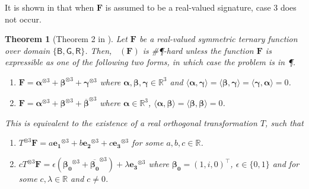 \documentclass[11pt]{article}
\newtheorem{theorem}{Theorem}[section]
\DeclareMathOperator{\holts}{Holant^*_3}
\newcommand{\db}{\mathsf{B}}
\newcommand{\dg}{\mathsf{G}}
\newcommand{\dr}{\mathsf{R}}
\newcommand{\teh}{^{\otimes 3}}
\newcommand{\transpose}{^\intercal}
\newcommand{\ternarytractgeneq}{$\mathfrak{A}$\xspace}
\newcommand{\ternarytractz}{$\mathfrak{B}$\xspace}
\begin{document}
It is shown in \cite{liu_restricted_nodate} that when $\mathbf{F}$ is assumed to be a real-valued signature, case 3 does not occur.
\begin{theorem}[Theorem 2 in \cite{liu_restricted_nodate}]
  \label{thm:dich-single-sym-ter-dom3-real}
  Let $\mathbf{F}$ be a real-valued symmetric ternary function over domain $\{\db, \dg, \dr\}$. 
  Then, $\holts(\mathbf{F})$ is \#\P-hard unless the function $\mathbf{F}$ is expressible as one of the following two forms, in which case the problem is in \P.
  \begin{enumerate}
\item[\ternarytractgeneq.] \label{ternary-tract-geneq}
      $\mathbf{F} = \boldsymbol{\alpha} \teh + \boldsymbol{\beta} \teh + \boldsymbol{\gamma}\teh$ 
      where $\boldsymbol{\alpha}, \boldsymbol{\beta}, \boldsymbol{\gamma} \in \mathbb{R}^3$ 
      and $\langle \boldsymbol{\alpha}, \boldsymbol{\gamma} \rangle = \langle \boldsymbol{\beta}, \boldsymbol{\gamma} \rangle = \langle \boldsymbol{\gamma}, \boldsymbol{\alpha} \rangle = 0$.
    \item[\ternarytractz.] \label{ternary-tract-Z}
      $\mathbf{F} = \boldsymbol{\alpha} \teh + \boldsymbol{\beta} \teh + \overline{\boldsymbol{\beta}}\teh$ where $\boldsymbol{\alpha} \in \mathbb{R}^3$, $\langle \boldsymbol{\alpha}, \boldsymbol{\beta} \rangle = \langle \boldsymbol{\beta}, \boldsymbol{\beta} \rangle = 0$.
  \end{enumerate}
  This is equivalent to the existence of a real orthogonal transformation $T$, such that 
  \begin{enumerate}
\item[\ternarytractgeneq.] $T\teh \mathbf{F} = a \mathbf{e_1}\teh + b \mathbf{e_2} \teh + c \mathbf{e_3}\teh$ for some $a, b, c \in \mathbb{R}$.
    \item[\ternarytractz.] $c T\teh \mathbf{F}  = \epsilon(\boldsymbol{\beta_0}\teh + \overline{\boldsymbol{\beta_0}}\teh) + \lambda \mathbf{e_3}\teh$ where $\boldsymbol{\beta_0} = (1, i, 0)\transpose$, $\epsilon \in \{0, 1\}$ and for some $c, \lambda \in \mathbb{R}$ and $c \ne 0$.
  \end{enumerate}
\end{theorem}
\end{document}
